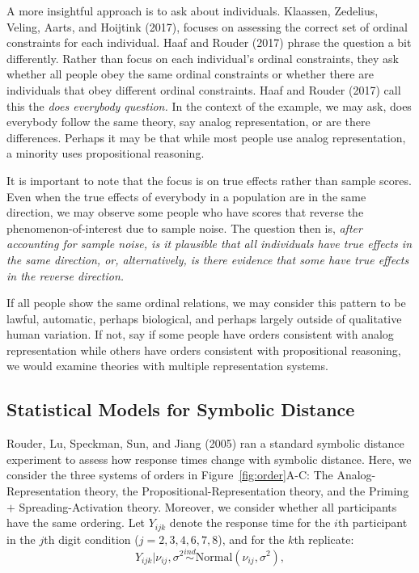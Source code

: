 \documentclass[english,,man]{apa6}
\begin{document}
A more insightful approach is to ask about individuals. Klaassen, Zedelius, Veling, Aarts, and Hoijtink (2017), focuses on assessing the correct set of ordinal constraints for each individual. Haaf and Rouder (2017) phrase the question a bit differently. Rather than focus on each individual's ordinal constraints, they ask whether all people obey the same ordinal constraints or whether there are individuals that obey different ordinal constraints. Haaf and Rouder (2017) call this the \emph{does everybody question.} In the context of the example, we may ask, does everybody follow the same theory, say analog representation, or are there differences. Perhaps it may be that while most people use analog representation, a minority uses propositional reasoning.

It is important to note that the focus is on true effects rather than sample scores. Even when the true effects of everybody in a population are in the same direction, we may observe some people who have scores that reverse the phenomenon-of-interest due to sample noise. The question then is, \emph{after accounting for sample noise, is it plausible that all individuals have true effects in the same direction, or, alternatively, is there evidence that some have true effects in the reverse direction.}

If all people show the same ordinal relations, we may consider this pattern to be lawful, automatic, perhaps biological, and perhaps largely outside of qualitative human variation. If not, say if some people have orders consistent with analog representation while others have orders consistent with propositional reasoning, we would examine theories with multiple representation systems.

\hypertarget{statistical-models-for-symbolic-distance}{%
\subsection{Statistical Models for Symbolic Distance}\label{statistical-models-for-symbolic-distance}}

Rouder, Lu, Speckman, Sun, and Jiang (2005) ran a standard symbolic distance experiment to assess how response times change with symbolic distance. Here, we consider the three systems of orders in Figure~\ref{fig:order}A-C: The Analog-Representation theory, the Propositional-Representation theory, and the Priming \(+\) Spreading-Activation theory. Moreover, we consider whether all participants have the same ordering. Let \(Y_{ijk}\) denote the response time for the \(i\)th participant in the \(j\)th digit condition (\(j=2, 3, 4, 6, 7, 8\)), and for the \(k\)th replicate:
\[Y_{ijk}|\nu_{ij},\sigma^2 \stackrel{ind}{\sim}\mbox{Normal}(\nu_{ij},\sigma^2),\]
\end{document}
